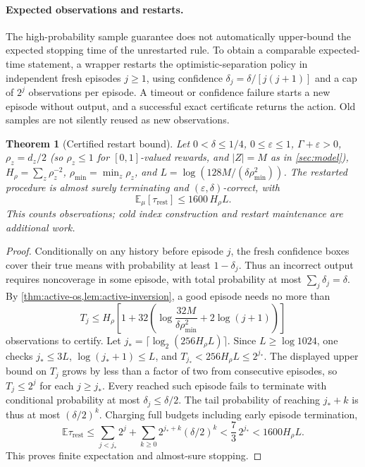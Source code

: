 \documentclass{article}
\theoremstyle{plain}
\newtheorem{theorem}{Theorem}[section]
\theoremstyle{definition}
\begin{document}
\paragraph{Expected observations and restarts.}
The high-probability sample guarantee does not automatically upper-bound the expected stopping time of the unrestarted rule. To obtain a comparable expected-time statement, a wrapper restarts the optimistic-separation policy in independent fresh episodes $j\ge1$, using confidence $\delta_j=\delta/[j(j+1)]$ and a cap of $2^j$ observations per episode. A timeout or confidence failure starts a new episode without output, and a successful exact certificate returns the action. Old samples are not silently reused as new observations.
\begin{theorem}[Certified restart bound]\label{thm:active-restart}
Let $0<\delta\le1/4$, $0\le\varepsilon\le1$, $\Gamma+\varepsilon>0$, $\rho_z=d_z/2$ (so $\rho_z\le1$ for $[0,1]$-valued rewards, and $|Z|=M$ as in \cref{sec:model}), $H_\rho=\sum_z\rho_z^{-2}$, $\rho_{\min}=\min_z\rho_z$, and $L=\log(128M/(\delta\rho_{\min}^2))$. The restarted procedure is almost surely terminating and $(\varepsilon,\delta)$-correct, with
\[
 \mathbb E_\mu[\tau_{\mathrm{rest}}]\le1600\,H_\rho L.
\]
This counts observations; cold index construction and restart maintenance are additional work.
\end{theorem}
\begin{proof}
Conditionally on any history before episode $j$, the fresh confidence boxes cover their true means with probability at least $1-\delta_j$. Thus an incorrect output requires noncoverage in some episode, with total probability at most $\sum_j\delta_j=\delta$. By \cref{thm:active-os,lem:active-inversion}, a good episode needs no more than
\[
 T_j\le H_\rho\left[1+32\left(\log\frac{32M}{\delta\rho_{\min}^2}+2\log(j+1)\right)\right]
\]
observations to certify. Let $j_*=\lceil\log_2(256H_\rho L)\rceil$. Since $L\ge\log1024$, one checks $j_*\le3L$, $\log(j_*+1)\le L$, and $T_{j_*}<256H_\rho L\le2^{j_*}$. The displayed upper bound on $T_j$ grows by less than a factor of two from consecutive episodes, so $T_j\le2^j$ for each $j\ge j_*$. Every reached such episode fails to terminate with conditional probability at most $\delta_j\le\delta/2$. The tail probability of reaching $j_*+k$ is thus at most $(\delta/2)^k$. Charging full budgets including early episode termination,
\[
 \mathbb E\tau_{\mathrm{rest}}\le\sum_{j<j_*}2^j
 +\sum_{k\ge0}2^{j_*+k}(\delta/2)^k
 <\frac73\,2^{j_*}<1600H_\rho L.
\]
This proves finite expectation and almost-sure stopping.
\end{proof}
\end{document}
